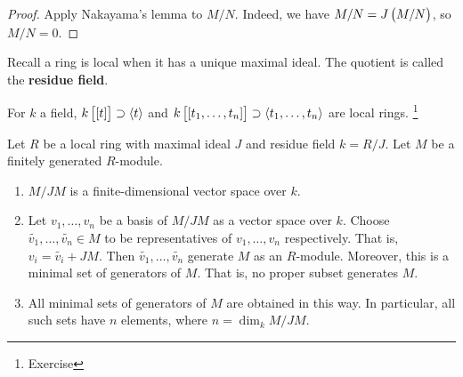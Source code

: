 \begin{proof}
Apply Nakayama's lemma to $ M / N $. Indeed, we have $ M / N = J\br{M / N} $, so $ M / N = 0 $.
\end{proof}

\pagebreak

Recall a ring is local when it has a unique maximal ideal. The quotient is called the \textbf{residue field}.

\begin{example*}
For $ k $ a field, $ k\sbr{\sbr{t}} \supset \abr{t} $ and $ k\sbr{\sbr{t_1, \dots, t_n}} \supset \abr{t_1, \dots, t_n} $ are local rings. \footnote{Exercise}
\end{example*}

\begin{theorem}
\label{thm:9.11}
Let $ R $ be a local ring with maximal ideal $ J $ and residue field $ k = R / J $. Let $ M $ be a finitely generated $ R $-module.
\begin{enumerate}
\item $ M / JM $ is a finite-dimensional vector space over $ k $.
\item Let $ v_1, \dots, v_n $ be a basis of $ M / JM $ as a vector space over $ k $. Choose $ \widetilde{v_1}, \dots, \widetilde{v_n} \in M $ to be representatives of $ v_1, \dots, v_n $ respectively. That is, $ v_i = \widetilde{v_i} + JM $. Then $ \widetilde{v_1}, \dots, \widetilde{v_n} $ generate $ M $ as an $ R $-module. Moreover, this is a minimal set of generators of $ M $. That is, no proper subset generates $ M $.
\item All minimal sets of generators of $ M $ are obtained in this way. In particular, all such sets have $ n $ elements, where $ n = \dim_k M / JM $.
\end{enumerate}
\end{theorem}

